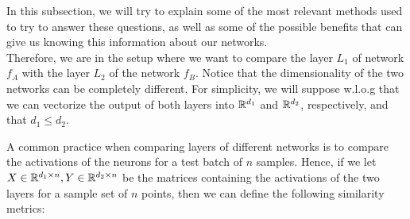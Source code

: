 \documentclass[../main.tex]{subfiles}
\begin{document}
In this subsection, we will try to explain some of the most relevant methods used to try to answer these questions, as well as some of the possible benefits that can give us knowing this information about our networks.\\

Therefore, we are in the setup where we want to compare the layer $L_1$ of network $f_A$ with the layer $L_2$ of the network $f_B$. Notice that the dimensionality of the two networks can be completely different. For simplicity, we will suppose w.l.o.g that we can vectorize the output of both layers into $\mathbb{R}^{d_1}$ and $\mathbb{R}^{d_2}$, respectively, and that $d_1 \leq d_2$.

A common practice when comparing layers of different networks is to compare the activations of the neurons for a test batch of $n$ samples. Hence, if we let $X\in \mathbb{R}^{d_1 \times n}, Y \in \mathbb{R}^{d_2 \times n}$ be the matrices containing the activations of the two layers for a sample set of $n$ points, then we can define the following similarity metrics:
\end{document}

